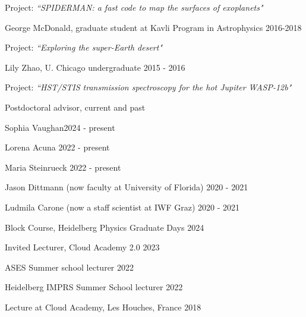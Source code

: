 \documentclass[12pt,letterpaper]{article}
\begin{document}
\begin{compactitem}[]
\begin{compactitem}
		\begin{sloppypar}
		Project: \textit{``SPIDERMAN: a fast code to map the surfaces of exoplanets"}
		\end{sloppypar}
	\item George McDonald, graduate student at Kavli Program in Astrophysics \hfill 2016-2018
		\begin{sloppypar}
		Project: \textit{``Exploring the super-Earth desert"}
		\end{sloppypar}
	\item Lily Zhao, U. Chicago undergraduate \hfill 2015 - 2016
		\begin{sloppypar}
		Project: \textit{``HST/STIS transmission spectroscopy for the hot Jupiter WASP-12b"}
		\end{sloppypar}
	\end{compactitem}
\item Postdoctoral advisor, current and past
    \begin{compactitem}
    \item {Sophia Vaughan\hfill 2024 - present}
    \item {Lorena Acuna \hfill 2022 - present}
    \item {Maria Steinrueck \hfill 2022 - present} 
    \item {Jason Dittmann (now faculty at University of Florida) \hfill 2020 - 2021}
    \item {Ludmila Carone (now a staff scientist at IWF Graz) \hfill 2020 - 2021}
    \end{compactitem}
\item Block Course, Heidelberg Physics Graduate Days \hfill 2024
\item Invited Lecturer, Cloud Academy 2.0 \hfill 2023
\item ASES Summer school lecturer \hfill 2022
\item Heidelberg IMPRS Summer School lecturer \hfill 2022
\item Lecture at Cloud Academy, Les Houches, France \hfill 2018

\end{compactitem}
\end{document}
